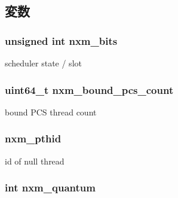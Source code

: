 \subsection{変数}
\hypertarget{structTru64_1_1nxm__sched__state_aebeca6fcbee8c6e89bdb8f64f661eda1}{
\subsubsection[{nxm\_\-bits}]{\setlength{\rightskip}{0pt plus 5cm}unsigned int {\bf nxm\_\-bits}}}
\label{structTru64_1_1nxm__sched__state_aebeca6fcbee8c6e89bdb8f64f661eda1}


scheduler state / slot \hypertarget{structTru64_1_1nxm__sched__state_adbbe482b35936baecb83728927feafa4}{
\subsubsection[{nxm\_\-bound\_\-pcs\_\-count}]{\setlength{\rightskip}{0pt plus 5cm}uint64\_\-t {\bf nxm\_\-bound\_\-pcs\_\-count}}}
\label{structTru64_1_1nxm__sched__state_adbbe482b35936baecb83728927feafa4}


bound PCS thread count \hypertarget{structTru64_1_1nxm__sched__state_a9037a44821c821f7098445624b66415e}{
\subsubsection[{nxm\_\-pthid}]{ {\bf nxm\_\-pthid}}}
\label{structTru64_1_1nxm__sched__state_a9037a44821c821f7098445624b66415e}


id of null thread \hypertarget{structTru64_1_1nxm__sched__state_a1edf25e35f3eb9bddad20dec442db246}{
\subsubsection[{nxm\_\-quantum}]{\setlength{\rightskip}{0pt plus 5cm}int {\bf nxm\_\-quantum}}}
\label{structTru64_1_1nxm__sched__state_a1edf25e35f3eb9bddad20dec442db246}



